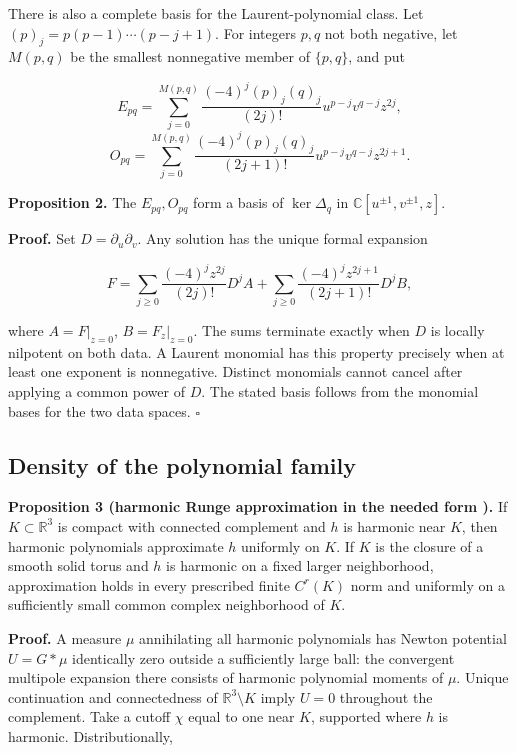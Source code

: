 There is also a complete basis for the Laurent-polynomial class. Let \((p)_j=p(p-1)\cdots(p-j+1)\). For integers \(p,q\) not both negative, let \(M(p,q)\) be the smallest nonnegative member of \(\{p,q\}\), and put

\[
E_{pq}=\sum_{j=0}^{M(p,q)}\frac{(-4)^j(p)_j(q)_j}{(2j)!}u^{p-j}v^{q-j}z^{2j},
\] \[
O_{pq}=\sum_{j=0}^{M(p,q)}\frac{(-4)^j(p)_j(q)_j}{(2j+1)!}u^{p-j}v^{q-j}z^{2j+1}.
\]

\textbf{Proposition 2.} The \(E_{pq},O_{pq}\) form a basis of \(\ker\Delta_q\) in \(\mathbb C[u^{\pm1},v^{\pm1},z]\).

\textbf{Proof.} Set \(D=\partial_u\partial_v\). Any solution has the unique formal expansion

\[
F=\sum_{j\ge0}\frac{(-4)^jz^{2j}}{(2j)!}D^jA
 +\sum_{j\ge0}\frac{(-4)^jz^{2j+1}}{(2j+1)!}D^jB,
\]

where \(A=F|_{z=0}\), \(B=F_z|_{z=0}\). The sums terminate exactly when \(D\) is locally nilpotent on both data. A Laurent monomial has this property precisely when at least one exponent is nonnegative. Distinct monomials cannot cancel after applying a common power of \(D\). The stated basis follows from the monomial bases for the two data spaces. \(\square\)

\subsection{Density of the polynomial family}\label{density-of-the-polynomial-family}

\textbf{Proposition 3 (harmonic Runge approximation in the needed form \cite{walsh}).} If \(K\subset\mathbb R^3\) is compact with connected complement and \(h\) is harmonic near \(K\), then harmonic polynomials approximate \(h\) uniformly on \(K\). If \(K\) is the closure of a smooth solid torus and \(h\) is harmonic on a fixed larger neighborhood, approximation holds in every prescribed finite \(C^r(K)\) norm and uniformly on a sufficiently small common complex neighborhood of \(K\).

\textbf{Proof.} A measure \(\mu\) annihilating all harmonic polynomials has Newton potential \(U=G*\mu\) identically zero outside a sufficiently large ball: the convergent multipole expansion there consists of harmonic polynomial moments of \(\mu\). Unique continuation and connectedness of \(\mathbb R^3\setminus K\) imply \(U=0\) throughout the complement. Take a cutoff \(\chi\) equal to one near \(K\), supported where \(h\) is harmonic. Distributionally,

